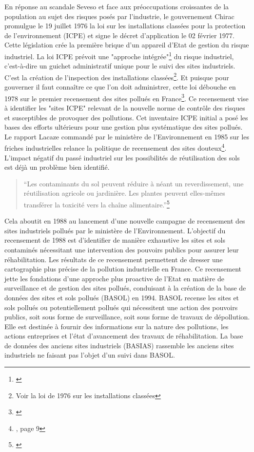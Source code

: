 \documentclass[a4paper,twoside,12pt]{book}
\begin{document}
En réponse au scandale Seveso et face aux préoccupations croissantes de la population au sujet des risques posés par l'industrie, le gouvernement Chirac promulgue le 19 juillet 1976 la loi sur les installations classées pour la protection de l'environnement (ICPE) et signe le décret d'application le 02 février 1977. Cette législation crée la première brique d'un appareil d'Etat de gestion du risque industriel. La loi ICPE prévoit une "approche intégrée"\footnote{\cite{ineris_historique_nodate}} du risque industriel, c'est-à-dire un guichet administratif unique pour le suivi des sites industriels. C'est la création de l’inspection des installations classées\footnote{Voir la loi de 1976 sur les installations classées}. Et puisque pour gouverner il faut connaître ce que l'on doit administrer, cette loi débouche en 1978 sur le premier recensement des sites pollués en France\footnote{\cite{brgm_casias_nodate}}. Ce recensement vise à identifier les "sites ICPE" relevant de la nouvelle norme de contrôle des risques et susceptibles de provoquer des pollutions. Cet inventaire ICPE initial a posé les bases des efforts ultérieurs pour une gestion plus systématique des sites pollués. Le rapport Lacaze commandé par le ministère de l'Environnement en 1985 sur les friches industrielles relance la politique de recensement des sites douteux\footnote{\cite{oge_sites_2004}, page 9}. L'impact négatif du passé industriel sur les possibilités de réutilisation des sols est déjà un problème bien identifié. 
\begin{quote}
“Les contaminants du sol peuvent réduire à néant un reverdissement, une réutilisation agricole ou jardinière. Les plantes peuvent elles-mêmes transférer la toxicité vers la chaîne alimentaire.”\footnote{\cite{oge_sites_2004}}
\end{quote}
Cela aboutit en 1988 au lancement d'une nouvelle campagne de recensement des sites industriels pollués par le ministère de l'Environnement. L'objectif du recensement de 1988 est d'identifier de manière exhaustive les sites et sols contaminés nécessitant une intervention des pouvoirs publics pour assurer leur réhabilitation. Les résultats de ce recensement permettent de dresser une cartographie plus précise de la pollution industrielle en France. Ce recensement jette les fondations d'une approche plus proactive de l'Etat en matière de surveillance et de gestion des sites pollués, conduisant à la création de la base de données des sites et sols pollués (BASOL) en 1994. BASOL recense les sites et sols pollués ou potentiellement pollués qui nécessitent une action des pouvoirs publics, soit sous forme de surveillance, soit sous forme de travaux de dépollution. Elle est destinée à fournir des informations sur la nature des pollutions, les actions entreprises et l'état d'avancement des travaux de réhabilitation. La base de données des anciens sites industriels (BASIAS) rassemble les anciens sites industriels ne faisant pas l'objet d'un suivi dans BASOL. 
\end{document}

